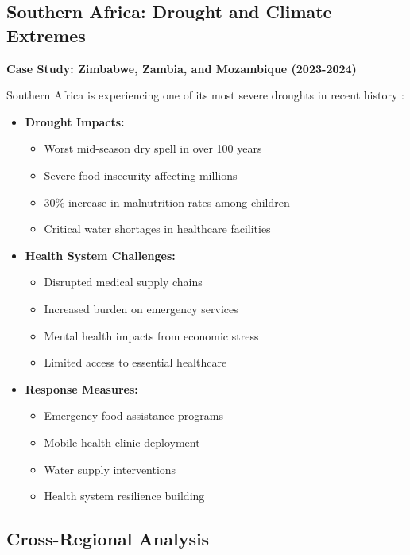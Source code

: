 \subsection{Southern Africa: Drought and Climate Extremes}
\textbf{Case Study: Zimbabwe, Zambia, and Mozambique (2023-2024)}

Southern Africa is experiencing one of its most severe droughts in recent history \citep{wfp2024drought,jrc2024drought}:

\begin{itemize}
    \item \textbf{Drought Impacts:}
    \begin{itemize}
        \item Worst mid-season dry spell in over 100 years
        \item Severe food insecurity affecting millions
        \item 30\% increase in malnutrition rates among children
        \item Critical water shortages in healthcare facilities
    \end{itemize}
    
    \item \textbf{Health System Challenges:}
    \begin{itemize}
        \item Disrupted medical supply chains
        \item Increased burden on emergency services
        \item Mental health impacts from economic stress
        \item Limited access to essential healthcare
    \end{itemize}
    
    \item \textbf{Response Measures:}
    \begin{itemize}
        \item Emergency food assistance programs
        \item Mobile health clinic deployment
        \item Water supply interventions
        \item Health system resilience building
    \end{itemize}
\end{itemize}

\subsection{Cross-Regional Analysis}

